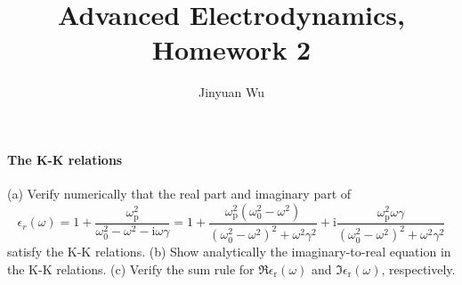 \documentclass[hyperref, a4paper]{article}
\title{Advanced Electrodynamics, Homework 2}
\author{Jinyuan Wu}
\begin{document}
\maketitle

\paragraph{The K-K relations} (a) Verify numerically that the real part and imaginary part of 
\begin{equation}
    \epsilon_{r}(\omega)=1+\frac{\omega_\text{p}^{2}}{\omega_{0}^{2}-\omega^{2}-\mathrm{i} \omega \gamma}=1+\frac{\omega_\text{p}^{2}\left(\omega_{0}^{2}-\omega^{2}\right)}{\left(\omega_{0}^{2}-\omega^{2}\right)^{2}+\omega^{2} \gamma^{2}}+\mathrm{i} \frac{\omega_\text{p}^{2} \omega \gamma}{\left(\omega_{0}^{2}-\omega^{2}\right)^{2}+\omega^{2} \gamma^{2}}
\end{equation}
satisfy the K-K relations.
(b) Show analytically the imaginary-to-real equation in the K-K relations.
(c) Verify the sum rule for $\Re \epsilon_\text{r}(\omega)$ and $\Im \epsilon_\text{r}(\omega)$, respectively.
\end{document}
